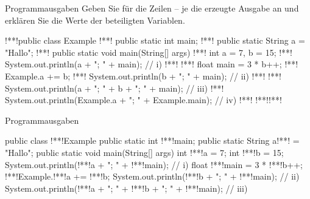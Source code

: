 {
\begin{frame}[c,fragile]{Programmausgaben}
Geben Sie für die Zeilen -- je die erzeugte Ausgabe an und erklären Sie die Werte der beteiligten Variablen.
\begin{plainjava}
!**!public class Example {
!**!   public static int main;
!**!   public static String a = "Hallo";
!**!   public static void main(String[] args) {
!**!      int a = 7,  b = 15;
!**!      System.out.println(a + "; " + main); // i)
!**!      {
!**!         float main = 3 * b++;
!**!         Example.a += b;
!**!         System.out.println(b + "; " + main); // ii)
!**!      }
!**!      System.out.println(a + "; " + b + "; " + main); // iii)
!**!      System.out.println(Example.a + "; " + Example.main); // iv)
!**!   }
!**!}!**!
\end{plainjava}
%
\end{frame}
\SidebarReset
\SidebarSolution
\def\Show<#1>#2;{\onslide<#1->{{\only<#1|handout:1>{\colorlet{@}{gray}}\path[@]#2;}}}
\def\ShowFull<#1>#2;{\onslide<#1-|handout:2>{{\only<#1>{\colorlet{@}{gray}}\path[@]#2;}}}
\begin{frame}[c,fragile]{Programmausgaben}
\begin{plainjava}
public class !**!Example {
   public static int !**!main;
   public static String a!**! = "Hallo";
   public static void main(String[] args) {
      int !**!a = 7;
      int !**!b = 15;
      System.out.println(!**!a + "; " + !**!main); // i)
      {
         float !**!main = 3 * !**!b++;
         !**!Example.!**!a += !**!b;
         System.out.println(!**!b + "; " + !**!main); // ii)
      }
      System.out.println(!**!a + "; " + !**!b + "; " + !**!main); // iii)
}}
\end{plainjava}
\end{frame}}

